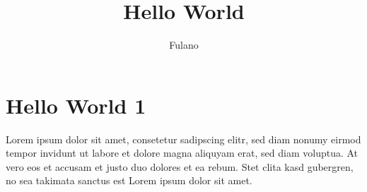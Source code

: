 \documentclass[A4paper, 12pt]{article}
\title{Hello World}
\author{Fulano}
\begin{document}
\maketitle
\tableofcontents


\section{Hello World 1} %

Lorem ipsum dolor sit amet, consetetur sadipscing elitr, sed diam nonumy eirmod
tempor invidunt ut labore et dolore magna aliquyam erat, sed diam voluptua. At
vero eos et accusam et justo duo dolores et ea rebum. Stet clita kasd gubergren,
no sea takimata sanctus est Lorem ipsum dolor sit amet.
\end{document}
